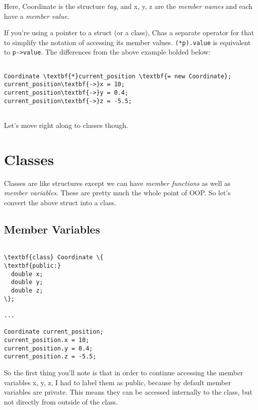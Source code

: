 \documentclass{IEEEtran}
\newcommand{\cpp}{C\nolinebreak\hspace{-.05em}\raisebox{.15ex}{\small\bf +}\nolinebreak\hspace{-.10em}\raisebox{.15ex}{\small\bf+\ }}
\begin{document}
Here, Coordinate is the structure \textit{tag}, and x, y, z are the\textit{ member names} and each have a \textit{member value}. 

If you're using a pointer to a struct (or a class), \cpp has a separate operator for that to simplify the notation of accessing its member values. \verb|(*p).value| is equivalent to \verb|p->value|. The differences from the above example bolded below:

\begin{Verbatim}[fontsize=\scriptsize, xleftmargin=.3in, commandchars=\\\{\}]
          
Coordinate \textbf{*}current_position \textbf{= new Coordinate};
current_position\textbf{->}x = 10;
current_position\textbf{->}y = 0.4;
current_position\textbf{->}z = -5.5;    
  
\end{Verbatim}

Let's move right along to classes though.

\section{Classes}

Classes are like structures except we can have \textit{member functions} as well as \textit{member variables}. These are pretty much the whole point of OOP. So let's convert the above struct into a class.

\subsection{Member Variables}

\begin{Verbatim}[fontsize=\scriptsize, xleftmargin=.3in, commandchars=\\\{\}]

\textbf{class} Coordinate \{
\textbf{public:}
  double x; 
  double y;
  double z;
\};

...

Coordinate current_position;
current_position.x = 10;
current_position.y = 0.4;
current_position.z = -5.5;  

\end{Verbatim}

So the first thing you'll note is that in order to continue accessing the member variables x, y, z, I had to label them as public, because by default member variables are private. This means they can be accessed internally to the class, but not directly from outside of the class.
\end{document}
